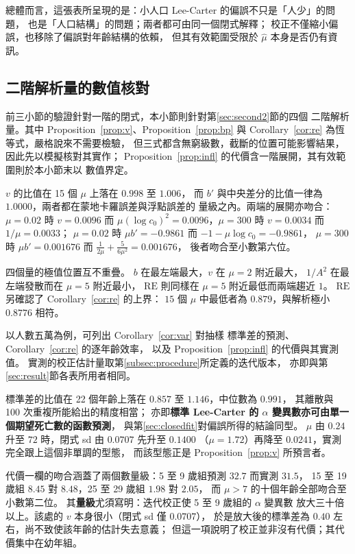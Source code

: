 \documentclass[UTF8, fontset=macnew, a4paper, 12pt]{ctexart}
\begin{document}
總體而言，這張表所呈現的是：小人口 Lee-Carter 的偏誤不只是「人少」的問題，
也是「人口結構」的問題；兩者都可由同一個閉式解釋；
校正不僅縮小偏誤，也移除了偏誤對年齡結構的依賴，
但其有效範圍受限於 $\hat\mu$ 本身是否仍有資訊。


\subsection{二階解析量的數值核對}\label{sec:vcheck}\label{sec:vsd}\label{sec:vinfl}

前三小節的驗證針對一階的閉式，本小節則針對第\ref{sec:second2}節的四個
二階解析量。其中 Proposition~\ref{prop:v}、Proposition~\ref{prop:bp} 與
Corollary~\ref{cor:re} 為恆等式，嚴格說來不需要檢驗，
但三式都含無窮級數，截斷的位置可能影響結果，因此先以模擬核對其實作；
Proposition~\ref{prop:infl} 的代價含一階展開，其有效範圍則於本小節末以
數值界定。

$v$ 的比值在 15 個 $\mu$ 上落在 $0.998$ 至 $1.006$，
而 $b'$ 與中央差分的比值一律為 $1.0000$，兩者都在蒙地卡羅誤差與浮點誤差的
量級之內。兩端的展開亦吻合：$\mu=0.02$ 時 $v=0.0096$ 而
$\mu(\log c_0)^2=0.0096$，$\mu=300$ 時 $v=0.0034$ 而 $1/\mu=0.0033$；
$\mu=0.02$ 時 $\mu b'=-0.9861$ 而 $-1-\mu\log c_0=-0.9861$，
$\mu=300$ 時 $\mu b'=0.001676$ 而 $\frac{1}{2\mu}+\frac{5}{6\mu^2}=0.001676$，
後者吻合至小數第六位。

四個量的極值位置互不重疊。
$b$ 在最左端最大，$v$ 在 $\mu=2$ 附近最大，
$1/A^2$ 在最左端發散而在 $\mu=5$ 附近最小，
$\mathrm{RE}$ 則同樣在 $\mu=5$ 附近最低而兩端趨近 $1$。
$\mathrm{RE}$ 另確認了 Corollary~\ref{cor:re} 的上界：
$15$ 個 $\mu$ 中最低者為 $0.879$，與解析極小 $0.8776$ 相符。


以人數五萬為例，可列出 Corollary~\ref{cor:var} 對抽樣
標準差的預測、Corollary~\ref{cor:re} 的逐年齡效率，
以及 Proposition~\ref{prop:infl} 的代價與其實測值。
實測的校正估計量取第\ref{subsec:procedure}所定義的迭代版本，
亦即與第\ref{sec:result}節各表所用者相同。

標準差的比值在 22 個年齡上落在 $0.857$ 至 $1.146$，中位數為 $0.991$，
其離散與 100 次重複所能給出的精度相當；
亦即\textbf{標準 Lee-Carter 的 $\alpha$ 變異數亦可由單一個期望死亡數的函數預測}，
與第\ref{sec:closedfit}對偏誤所得的結論同型。
$\mu$ 由 $0.24$ 升至 $72$ 時，閉式 sd 由 $0.0707$ 先升至 $0.1400$
（$\mu=1.72$）再降至 $0.0241$，實測完全跟上這個非單調的型態，
而該型態正是 Proposition~\ref{prop:v} 所預言者。

代價一欄的吻合涵蓋了兩個數量級：5 至 9 歲組預測 $32.7$ 而實測 $31.5$，
15 至 19 歲組 $8.45$ 對 $8.48$，25 至 29 歲組 $1.98$ 對 $2.05$，
而 $\mu>7$ 的十個年齡全部吻合至小數第二位。
其\textbf{量級}尤須寫明：迭代校正使 5 至 9 歲組的 $\alpha$ 變異數
放大三十倍以上。該處的 $v$ 本身很小（閉式 sd 僅 $0.0707$），
於是放大後的標準差為 $0.40$ 左右，尚不致使該年齡的估計失去意義；
但這一項說明了校正並非沒有代價；其代價集中在幼年組。
\end{document}
